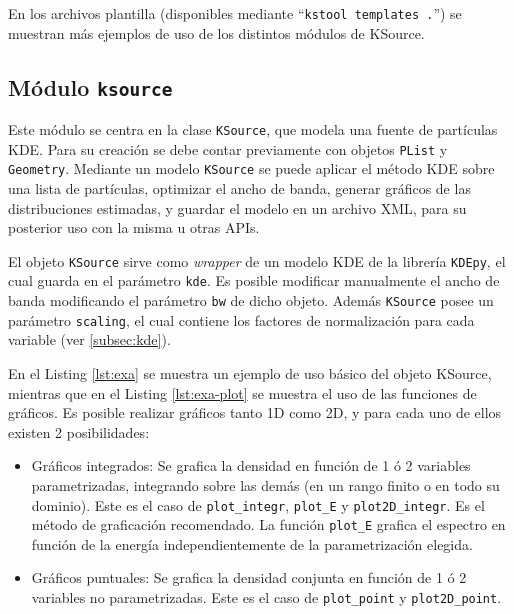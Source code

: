 En los archivos plantilla (disponibles mediante ``\verb|kstool templates .|'') se muestran más ejemplos de uso de los distintos módulos de KSource.


\subsection{Módulo \texttt{ksource}}

Este módulo se centra en la clase \verb|KSource|, que modela una fuente de partículas KDE. Para su creación se debe contar previamente con objetos \verb|PList| y \verb|Geometry|. Mediante un modelo \verb|KSource| se puede aplicar el método KDE sobre una lista de partículas, optimizar el ancho de banda, generar gráficos de las distribuciones estimadas, y guardar el modelo en un archivo XML, para su posterior uso con la misma u otras APIs.

El objeto \verb|KSource| sirve como \emph{wrapper} de un modelo KDE de la librería \verb|KDEpy|, el cual guarda en el parámetro \verb|kde|. Es posible modificar manualmente el ancho de banda modificando el parámetro \verb|bw| de dicho objeto. Además \verb|KSource| posee un parámetro \verb|scaling|, el cual contiene los factores de normalización para cada variable (ver \ref{subsec:kde}).

En el Listing \ref{lst:exa} se muestra un ejemplo de uso básico del objeto KSource, mientras que en el Listing \ref{lst:exa-plot} se muestra el uso de las funciones de gráficos. Es posible realizar gráficos tanto 1D como 2D, y para cada uno de ellos existen 2 posibilidades:
\begin{itemize}
	\item Gráficos integrados: Se grafica la densidad en función de 1 ó 2 variables parametrizadas, integrando sobre las demás (en un rango finito o en todo su dominio). Este es el caso de \verb|plot_integr|, \verb|plot_E| y \verb|plot2D_integr|. Es el método de graficación recomendado. La función \verb|plot_E| grafica el espectro en función de la energía independientemente de la parametrización elegida. 
	\item Gráficos puntuales: Se grafica la densidad conjunta en función de 1 ó 2 variables no parametrizadas. Este es el caso de \verb|plot_point| y \verb|plot2D_point|.
\end{itemize}

